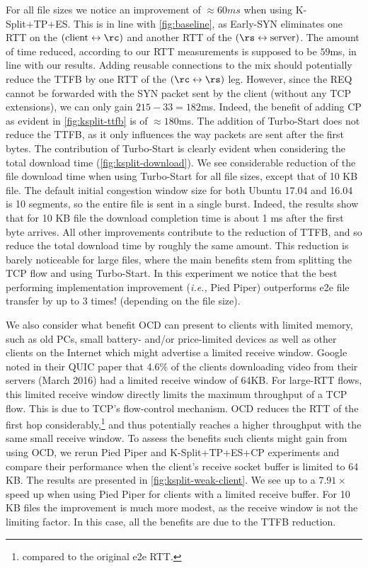 \documentclass[newfonts=false,format=sigconf,10pt,letterpaper]{acmart}
\providecommand{\ie}{\emph{i.e.,} }
\newcommand{\oursys}{Pied Piper\xspace}
\newcommand{\ksplit}{K-Split\xspace}
\newcommand{\reconn}{reusable connections\xspace}
\begin{document}
For all file sizes we notice an improvement of $\approx60ms$ when using \ksplit+TP+ES. This is in line with \autoref{fig:baseline}, as Early-SYN eliminates one RTT on the $(\mbox{client}\leftrightarrow\rc)$ and another RTT of the $(\rs\leftrightarrow\mbox{server})$. The amount of time reduced, according to our RTT measurements is supposed to be $59$ms, in line with our results. Adding \reconn to the mix should potentially reduce the TTFB by one RTT of the $(\rc\leftrightarrow\rs)$ leg. However, since the REQ cannot be forwarded with the SYN packet sent by the client (without any TCP extensions), we can only gain $215-33=182$ms. Indeed, the benefit of adding CP as evident in \autoref{fig:ksplit-ttfb} is of $\approx 180$ms. The addition of Turbo-Start does not reduce the TTFB, as it only influences the way packets are sent after the first bytes. The contribution of Turbo-Start is clearly evident when considering the total download time (\autoref{fig:ksplit-download}). We see considerable reduction of the file download time when using Turbo-Start for all file sizes, except that of 10 KB file. The default initial congestion window size for both Ubuntu 17.04 and 16.04 is 10 segments, so the entire file is sent in a single burst. Indeed, the results show that for 10 KB file the download completion time is about 1 ms after the first byte arrives. All other improvements contribute to the reduction of TTFB, and so reduce the total download time by roughly the same amount. This reduction is barely noticeable for large files, where the main benefits stem from splitting the TCP flow and using Turbo-Start.
In this experiment we notice that the best performing implementation improvement (\ie \oursys) outperforms e2e file transfer by up to 3 times! (depending on the file size).

We also consider what benefit OCD can present to clients with limited memory, such as old PCs, small battery- and/or price-limited devices as well as other clients on the Internet which might advertise a limited receive window. Google noted in their QUIC paper \cite{quic} that 4.6\% of the clients downloading video from their servers (March 2016) had a limited receive window of 64KB. For large-RTT flows, this limited receive window directly limits the maximum throughput of a TCP flow. This is due to TCP's flow-control mechanism. OCD reduces the RTT of the first hop considerably,\footnote{compared to the original e2e RTT.} and thus potentially reaches a higher throughput with the same small receive window.
To assess the benefits such clients might gain from using OCD, we rerun \oursys and K-Split+TP+ES+CP experiments and compare their performance when the client's receive socket buffer is limited to 64 KB. The results are presented in \autoref{fig:ksplit-weak-client}. We see up to a $7.91\times$ speed up when using \oursys for clients with a limited receive buffer. For 10 KB files the improvement is much more modest, as the receive window is not the limiting factor. In this case, all the benefits are due to the TTFB reduction. 
\end{document}
